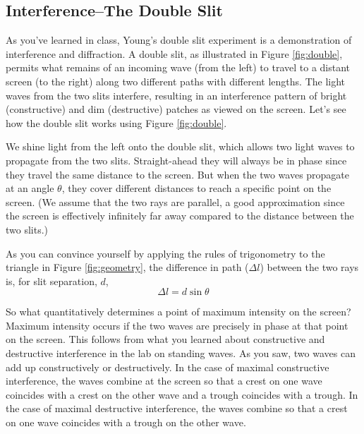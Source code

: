 \subsection{Interference--The Double Slit}
As you've learned in class, Young's double slit experiment is a demonstration of interference and diffraction. A double slit, as illustrated in Figure {\ref{fig:double}}, permits what remains of an incoming wave (from the left) to travel to a distant screen (to the right) along two different paths with different lengths. The light waves from the two slits interfere, resulting in an interference pattern of bright (constructive) and dim (destructive) patches as viewed on the screen. Let's see how the double slit works using Figure {\ref{fig:double}}.

We shine light from the left onto the double slit, which allows two light waves to propagate from the two slits. Straight-ahead they will always be in phase since they travel the same distance to the screen. But when the two waves propagate at an angle $\theta$, they cover different distances to reach a specific point on the screen. (We assume that the two rays are parallel, a good approximation since the screen is effectively infinitely far away compared to the distance between the two slits.)\myskip

As you can convince yourself by applying the rules of trigonometry to the triangle in Figure {\ref{fig:geometry}}, the difference in path ($\Delta l$) between the two rays is, for slit separation, $d$,
\begin{equation}
  \Delta l =d\sin\theta
\end{equation}

So what quantitatively determines a point of maximum intensity on the screen? Maximum intensity occurs if the two waves are precisely in phase at that point on the screen. This follows from what you learned about constructive and destructive interference in the lab on standing waves. As you saw, two waves can add up constructively or destructively. In the case of maximal constructive interference, the waves combine at the screen so that a crest on one wave coincides with a crest on the other wave and a trough coincides with a trough. In the case of maximal destructive interference, the waves combine so that a crest on one wave coincides with a trough on the other wave. \myskip

